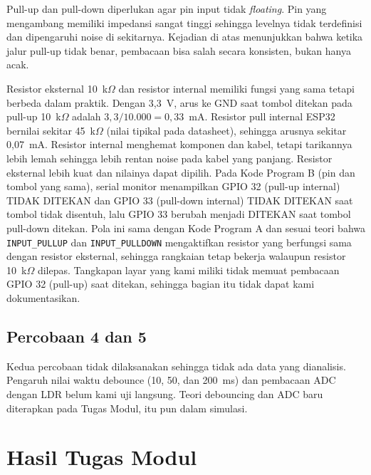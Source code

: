 Pull-up dan pull-down diperlukan agar pin input tidak \emph{floating}. Pin yang mengambang memiliki impedansi sangat tinggi sehingga levelnya tidak terdefinisi dan dipengaruhi noise di sekitarnya. Kejadian di atas menunjukkan bahwa ketika jalur pull-up tidak benar, pembacaan bisa salah secara konsisten, bukan hanya acak.

Resistor eksternal 10~k$\Omega$ dan resistor internal memiliki fungsi yang sama tetapi berbeda dalam praktik. Dengan 3,3~V, arus ke GND saat tombol ditekan pada pull-up 10~k$\Omega$ adalah $3{,}3/10.000 = 0{,}33$~mA. Resistor pull internal ESP32 bernilai sekitar 45~k$\Omega$ (nilai tipikal pada datasheet), sehingga arusnya sekitar 0,07~mA. Resistor internal menghemat komponen dan kabel, tetapi tarikannya lebih lemah sehingga lebih rentan noise pada kabel yang panjang. Resistor eksternal lebih kuat dan nilainya dapat dipilih.
\ifBagianB
Pada Kode Program B (pin dan tombol yang sama), serial monitor menampilkan GPIO 32 (pull-up internal) TIDAK DITEKAN dan GPIO 33 (pull-down internal) TIDAK DITEKAN saat tombol tidak disentuh, lalu GPIO 33 berubah menjadi DITEKAN saat tombol pull-down ditekan. Pola ini sama dengan Kode Program A dan sesuai teori bahwa \texttt{INPUT\_PULLUP} dan \texttt{INPUT\_PULLDOWN} mengaktifkan resistor yang berfungsi sama dengan resistor eksternal, sehingga rangkaian tetap bekerja walaupun resistor 10~k$\Omega$ dilepas. Tangkapan layar yang kami miliki tidak memuat pembacaan GPIO 32 (pull-up) saat ditekan, sehingga bagian itu tidak dapat kami dokumentasikan.
\fi

\subsection{Percobaan 4 dan 5}
Kedua percobaan tidak dilaksanakan sehingga tidak ada data yang dianalisis. Pengaruh nilai waktu debounce (10, 50, dan 200~ms) dan pembacaan ADC dengan LDR belum kami uji langsung. Teori debouncing dan ADC baru diterapkan pada Tugas Modul, itu pun dalam simulasi.

\section{Hasil Tugas Modul}
